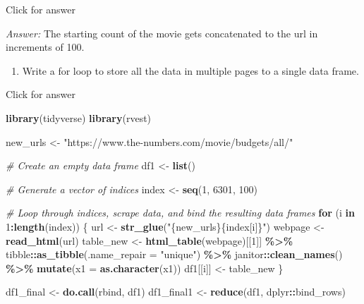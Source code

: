 \documentclass[
]{book}
\newenvironment{Shaded}{\begin{snugshade}}{\end{snugshade}}
\newcommand{\AttributeTok}[1]{\textcolor[rgb]{0.13,0.29,0.53}{#1}}
\newcommand{\CommentTok}[1]{\textcolor[rgb]{0.56,0.35,0.01}{\textit{#1}}}
\newcommand{\ControlFlowTok}[1]{\textcolor[rgb]{0.13,0.29,0.53}{\textbf{#1}}}
\newcommand{\DecValTok}[1]{\textcolor[rgb]{0.00,0.00,0.81}{#1}}
\newcommand{\FunctionTok}[1]{\textcolor[rgb]{0.13,0.29,0.53}{\textbf{#1}}}
\newcommand{\NormalTok}[1]{#1}
\newcommand{\OtherTok}[1]{\textcolor[rgb]{0.56,0.35,0.01}{#1}}
\newcommand{\SpecialCharTok}[1]{\textcolor[rgb]{0.81,0.36,0.00}{\textbf{#1}}}
\newcommand{\StringTok}[1]{\textcolor[rgb]{0.31,0.60,0.02}{#1}}
\providecommand{\tightlist}{%
  \setlength{\itemsep}{0pt}\setlength{\parskip}{0pt}}
\begin{document}
Click for answer

\emph{Answer:} The starting count of the movie gets concatenated to the url in increments of 100.

\begin{enumerate}
\def\labelenumi{\arabic{enumi}.}
\setcounter{enumi}{2}
\tightlist
\item
  Write a for loop to store all the data in multiple pages to a single data frame.
\end{enumerate}

Click for answer

\begin{Shaded}
\begin{Highlighting}[]
\FunctionTok{library}\NormalTok{(tidyverse)}
\FunctionTok{library}\NormalTok{(rvest)}

\NormalTok{new\_urls }\OtherTok{\textless{}{-}} \StringTok{"https://www.the{-}numbers.com/movie/budgets/all/"}

\CommentTok{\# Create an empty data frame}
\NormalTok{df1 }\OtherTok{\textless{}{-}} \FunctionTok{list}\NormalTok{()}

\CommentTok{\# Generate a vector of indices}
\NormalTok{index }\OtherTok{\textless{}{-}} \FunctionTok{seq}\NormalTok{(}\DecValTok{1}\NormalTok{, }\DecValTok{6301}\NormalTok{, }\DecValTok{100}\NormalTok{)}
\end{Highlighting}
\end{Shaded}

\begin{Shaded}
\begin{Highlighting}[]
\CommentTok{\# Loop through indices, scrape data, and bind the resulting data frames}
\ControlFlowTok{for}\NormalTok{ (i }\ControlFlowTok{in} \DecValTok{1}\SpecialCharTok{:}\FunctionTok{length}\NormalTok{(index)) \{}
\NormalTok{  url }\OtherTok{\textless{}{-}} \FunctionTok{str\_glue}\NormalTok{(}\StringTok{"\{new\_urls\}\{index[i]\}"}\NormalTok{)}
\NormalTok{  webpage }\OtherTok{\textless{}{-}} \FunctionTok{read\_html}\NormalTok{(url)}
\NormalTok{  table\_new }\OtherTok{\textless{}{-}} \FunctionTok{html\_table}\NormalTok{(webpage)[[}\DecValTok{1}\NormalTok{]] }\SpecialCharTok{\%\textgreater{}\%}
\NormalTok{    tibble}\SpecialCharTok{::}\FunctionTok{as\_tibble}\NormalTok{(}\AttributeTok{.name\_repair =} \StringTok{"unique"}\NormalTok{) }\SpecialCharTok{\%\textgreater{}\%} 
\NormalTok{    janitor}\SpecialCharTok{::}\FunctionTok{clean\_names}\NormalTok{() }\SpecialCharTok{\%\textgreater{}\%} 
    \FunctionTok{mutate}\NormalTok{(}\AttributeTok{x1 =} \FunctionTok{as.character}\NormalTok{(x1))}
\NormalTok{  df1[[i]] }\OtherTok{\textless{}{-}}\NormalTok{ table\_new}
\NormalTok{\}}

\NormalTok{df1\_final }\OtherTok{\textless{}{-}} \FunctionTok{do.call}\NormalTok{(rbind, df1)}
\NormalTok{df1\_final1 }\OtherTok{\textless{}{-}} \FunctionTok{reduce}\NormalTok{(df1, dplyr}\SpecialCharTok{::}\NormalTok{bind\_rows)}
\end{Highlighting}
\end{Shaded}
\end{document}
